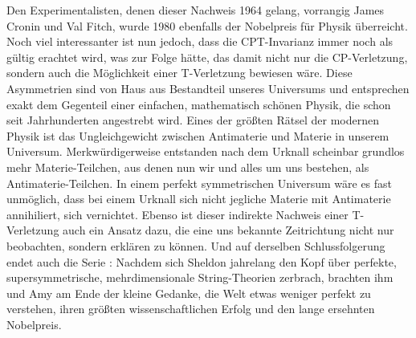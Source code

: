 \documentclass[12pt,a4paper]{scrartcl}
\numberwithin{equation}{section}
\begin{document}
Den Experimentalisten, denen dieser Nachweis 1964 gelang, vorrangig James Cronin und Val Fitch, wurde 1980 ebenfalls der Nobelpreis für Physik überreicht.\cite{croninfitch64} Noch viel interessanter ist nun jedoch, dass die CPT-Invarianz immer noch als gültig erachtet wird, was zur Folge hätte, das damit nicht nur die CP-Verletzung, sondern auch die Möglichkeit einer T-Verletzung bewiesen wäre. Diese Asymmetrien sind von Haus aus Bestandteil unseres Universums und entsprechen exakt dem Gegenteil einer einfachen, mathematisch schönen Physik, die schon seit Jahrhunderten angestrebt wird. Eines der größten Rätsel der modernen Physik ist das Ungleichgewicht zwischen Antimaterie und Materie in unserem Universum. Merkwürdigerweise entstanden nach dem Urknall scheinbar grundlos mehr Materie-Teilchen, aus denen nun wir und alles um uns bestehen, als Antimaterie-Teilchen. In einem perfekt symmetrischen Universum wäre es fast unmöglich, dass bei einem Urknall sich nicht jegliche Materie mit Antimaterie annihiliert, sich vernichtet. Ebenso ist dieser indirekte Nachweis einer T-Verletzung auch ein Ansatz dazu, die eine uns bekannte Zeitrichtung nicht nur beobachten, sondern erklären zu können. Und auf derselben Schlussfolgerung endet auch die Serie \grqq{}: Nachdem sich Sheldon jahrelang den Kopf über perfekte, supersymmetrische, mehrdimensionale String-Theorien zerbrach, brachten ihm und Amy am Ende der kleine Gedanke, die Welt etwas weniger perfekt zu verstehen, ihren größten wissenschaftlichen Erfolg und den lange ersehnten Nobelpreis. \cite{prosieben19}

  \newpage  %
\end{document}
